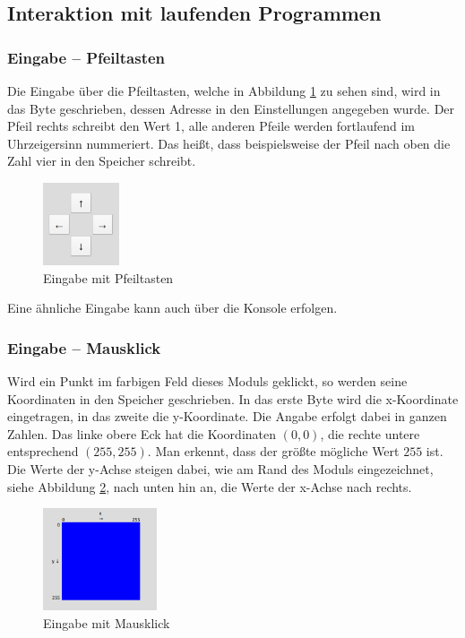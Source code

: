 \subsection{Interaktion mit laufenden Programmen}

\subsubsection{Eingabe -- Pfeiltasten}
Die Eingabe über die Pfeiltasten, welche in Abbildung \ref{Joystick} zu sehen sind, wird in das Byte geschrieben, dessen Adresse in den Einstellungen angegeben wurde. Der Pfeil rechts schreibt den Wert 1, alle anderen Pfeile werden fortlaufend im Uhrzeigersinn nummeriert. Das heißt, dass beispielsweise der Pfeil nach oben die Zahl vier in den Speicher schreibt.
\begin{figure}[ht]
	\centering
	\includegraphics[width=0.2\textwidth]{Images/Joystick}
	\caption{Eingabe mit Pfeiltasten}
	\label{Joystick}
\end{figure}
Eine ähnliche Eingabe kann auch über die Konsole erfolgen.


\subsubsection{Eingabe -- Mausklick}
Wird ein Punkt im farbigen Feld dieses Moduls geklickt, so werden seine Koordinaten in den Speicher geschrieben. In das erste Byte wird die x-Koordinate eingetragen, in das zweite die y-Koordinate. Die Angabe erfolgt dabei in ganzen Zahlen. Das linke obere Eck hat die Koordinaten $(0, 0)$, die rechte untere entsprechend $(255, 255)$. Man erkennt, dass der größte mögliche Wert $255$ ist. Die Werte der y-Achse steigen dabei, wie am Rand des Moduls eingezeichnet, siehe Abbildung \ref{MouseArea}, nach unten hin an, die Werte der x-Achse nach rechts.
\begin{figure}[ht]
	\centering
	\includegraphics[width=0.3\textwidth]{Images/MouseArea}
	\caption{Eingabe mit Mausklick}
	\label{MouseArea}
\end{figure}

